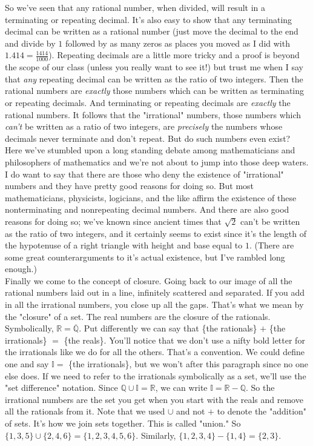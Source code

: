 \documentclass[11pt,letterpaper]{article}
\begin{document}
\noindent So we've seen that any rational number, when divided, will result in a terminating or repeating decimal. It's also easy to show that any terminating decimal can be written as a rational number (just move the decimal to the end and divide by $1$ followed by as many zeros as places you moved as I did with $1.414 = \frac{1414}{1000}$). Repeating decimals are a little more tricky and a proof is beyond the scope of our class (unless you really want to see it!) but trust me when I say that \textit{any} repeating decimal can be written as the ratio of two integers. Then the rational numbers are \textit{exactly} those numbers which can be written as terminating or repeating decimals. And terminating or repeating decimals are \textit{exactly} the rational numbers. It follows that the "irrational" numbers, those numbers which \textit{can't} be written as a ratio of two integers, are \textit{precisely} the numbers whose decimals never terminate and don't repeat. But do such numbers even exist? \\

\noindent Here we've stumbled upon a long standing debate among mathematicians and philosophers of mathematics and we're not about to jump into those deep waters. I do want to say that there are those who deny the existence of "irrational" numbers and they have pretty good reasons for doing so. But most mathematicians, physicists, logicians, and the like affirm the existence of these nonterminating and nonrepeating decimal numbers. And there are also good reasons for doing so; we've known since ancient times that $\sqrt{2}$ can't be written as the ratio of two integers, and it certainly seems to exist since it's the length of the hypotenuse of a right triangle with height and base equal to $1$. (There are some great counterarguments to it's actual existence, but I've rambled long enough.) \\

\noindent Finally we come to the concept of closure. Going back to our image of all the rational numbers laid out in a line, infinitely scattered and separated. If you add in all the irrational numbers, you close up all the gaps. That's what we mean by the "closure" of a set. The real numbers are the closure of the rationals. Symbolically, $\mathbb{R} = \overline{\mathbb{Q}}$. Put differently we can say that \{the rationals\} $+$ \{the irrationals\} $=$ \{the reals\}. You'll notice that we don't use a nifty bold letter for the irrationals like we do for all the others. That's a convention. We could define one and say $\mathbb{I} =$ \{the irrationals\}, but we won't after this paragraph since no one else does. If we need to refer to the irrationals symbolically as a set, we'll use the "set difference" notation. Since $\mathbb{Q} \cup \mathbb{I} = \mathbb{R}$, we can write $\mathbb{I} = \mathbb{R} - \mathbb{Q}$. So the irrational numbers are the set you get when you start with the reals and remove all the rationals from it. Note that we used $\cup$ and not $+$ to denote the "addition" of sets. It's how we join sets together. This is called "union." So $ \{1, 3, 5\} \cup \{2, 4, 6\} = \{1,2,3,4,5,6\}$. Similarly, $\{1,2,3,4\} - \{1,4\} = \{2,3\}$. \\
\end{document}
